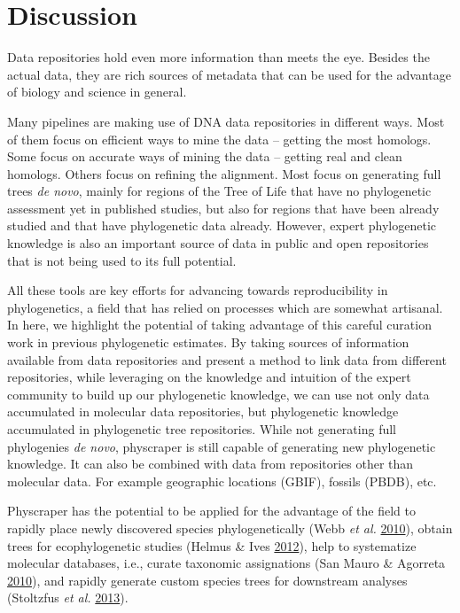 \documentclass[]{article}
\begin{document}
\hypertarget{discussion}{%
\section{Discussion}\label{discussion}}

Data repositories hold even more information than meets the eye.
Besides the actual data, they are rich sources of metadata that can be used for the advantage of biology and science in general.

Many pipelines are making use of DNA data repositories in different ways.
Most of them focus on efficient ways to mine the data -- getting the most homologs.
Some focus on accurate ways of mining the data -- getting real and clean homologs.
Others focus on refining the alignment.
Most focus on generating full trees \emph{de novo}, mainly for regions of the Tree of
Life that have no phylogenetic assessment yet in published studies, but also for
regions that have been already studied and that have phylogenetic data already.
However, expert phylogenetic knowledge is also an important source of data in public
and open repositories that is not being used to its full potential.

All these tools are key efforts for advancing towards reproducibility in phylogenetics,
a field that has relied on processes which are somewhat artisanal.
In here, we highlight the potential of taking advantage of this careful curation work in previous phylogenetic estimates. By taking sources of information available from data repositories and present a method to link data from different repositories, while leveraging on the knowledge and intuition of the expert
community to build up our phylogenetic knowledge, we can use not only data accumulated in
molecular data repositories, but phylogenetic knowledge accumulated in phylogenetic tree repositories.
While not generating full phylogenies \emph{de novo}, physcraper is still capable of generating new phylogenetic knowledge.
It can also be combined with data from repositories other than molecular data. For example geographic locations (GBIF), fossils (PBDB), etc.

Physcraper has the potential to be applied for the advantage of the field to rapidly
place newly discovered species phylogenetically (Webb \emph{et al.} \protect\hyperlink{ref-webb2010biodiversity}{2010}),
obtain trees for ecophylogenetic studies (Helmus \& Ives \protect\hyperlink{ref-helmus2012phylogenetic}{2012}),
help to systematize molecular databases, i.e., curate taxonomic assignations (San Mauro \& Agorreta \protect\hyperlink{ref-san2010molecular}{2010}),
and rapidly generate custom species trees for downstream analyses (Stoltzfus \emph{et al.} \protect\hyperlink{ref-stoltzfus2013phylotastic}{2013}).
\end{document}
